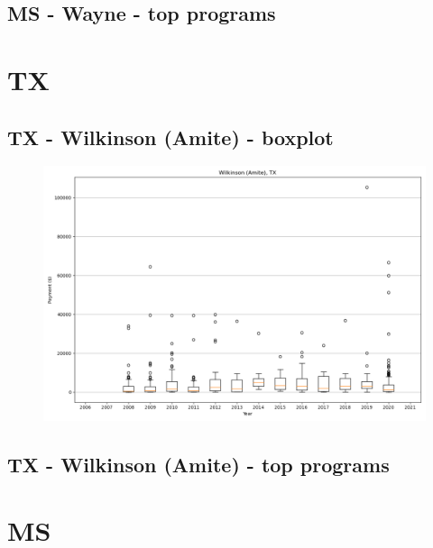\subsection*{MS - Wayne - top programs}

\newpage
\section*{TX}
\subsection*{TX - Wilkinson (Amite) - boxplot}
\begin{figure}[h]
\centering
\includegraphics[width=7in]{../output/boxplots/counties/Wilkinson (Amite)-TX_boxplot.png}
\end{figure}


\subsection*{TX - Wilkinson (Amite) - top programs}

\newpage
\section*{MS}

